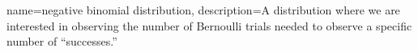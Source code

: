 {
    name={negative binomial distribution},
    description={A distribution where we are interested in observing the number of Bernoulli trials needed to observe a specific number of ``successes.''}
}

